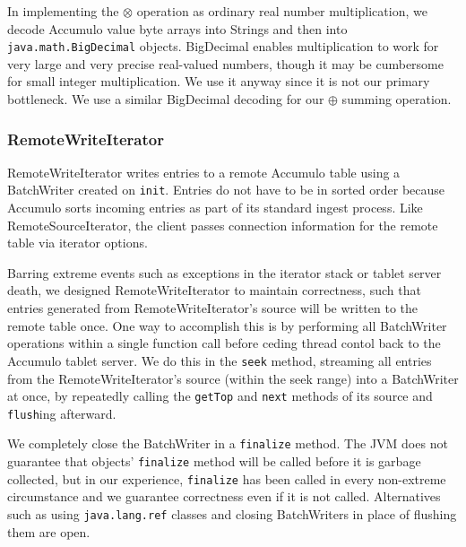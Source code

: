In implementing the $\otimes$ operation as ordinary real number multiplication,
we decode Accumulo value byte arrays into Strings and then into \texttt{java.math.BigDecimal}
objects. BigDecimal enables multiplication to work for very large and very precise real-valued numbers,
though it may be cumbersome for small integer multiplication. We use it anyway since it is not our
primary bottleneck.  We use a similar BigDecimal decoding for our $\oplus$ summing operation.

\subsubsection{RemoteWriteIterator}
RemoteWriteIterator writes entries to a remote Accumulo table using a BatchWriter created on \texttt{init}.
Entries do not have to be in sorted order because Accumulo sorts incoming entries as part of its
standard ingest process. Like RemoteSourceIterator, the client passes connection information 
for the remote table via iterator options.

Barring extreme events such as exceptions in the iterator stack or tablet server death,
we designed RemoteWriteIterator to maintain correctness, such that entries generated from
RemoteWriteIterator's source will be written to the remote table once.
One way to accomplish this is by performing all BatchWriter operations within a single function call
before ceding thread contol back to the Accumulo tablet server.  We do this in the \texttt{seek} method,
streaming all entries from the RemoteWriteIterator's source (within the seek range) into a BatchWriter at once, 
by repeatedly calling the \texttt{getTop} and \texttt{next} methods of its source and \texttt{flush}ing afterward.

We completely close the BatchWriter in a \texttt{finalize} method.
The JVM does not guarantee that objects' \texttt{finalize} method will be called before it is 
garbage collected, but in our experience, \texttt{finalize} has been called in every non-extreme circumstance
and we guarantee correctness even if it is not called. Alternatives such as using \texttt{java.lang.ref}
classes and closing BatchWriters in place of flushing them are open.

